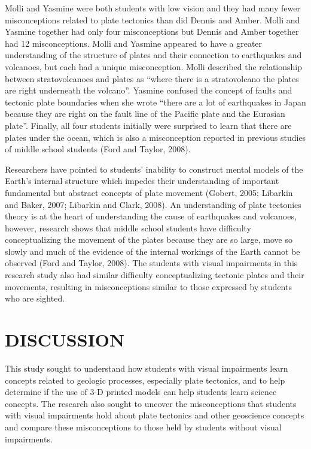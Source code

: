 \documentclass[11.5pt]{sig-alternate} %
\begin{document}
\begin{large}
Molli and Yasmine were both students with low vision and they had many fewer misconceptions related to plate tectonics than did Dennis and Amber.  Molli and Yasmine together had only four misconceptions but Dennis and Amber together had 12 misconceptions.  Molli and Yasmine appeared to have a greater understanding of the structure of plates and their connection to earthquakes and volcanoes, but each had a unique misconception.  Molli described the relationship between stratovolcanoes and plates as “where there is a stratovolcano the plates are right underneath the volcano”.  Yasmine confused the concept of faults and tectonic plate boundaries when she wrote “there are a lot of earthquakes in Japan because they are right on the fault line of the Pacific plate and the Eurasian plate”.  Finally, all four students initially were surprised to learn that there are plates under the ocean, which is also a misconception reported in previous studies of middle school students (Ford and Taylor, 2008). 

Researchers have pointed to students’ inability to construct mental models of the Earth’s internal structure which impedes their understanding of important fundamental but abstract concepts of plate movement (Gobert, 2005; Libarkin and Baker, 2007; Libarkin and Clark, 2008).  An understanding of plate tectonics theory is at the heart of understanding the cause of earthquakes and volcanoes, however, research shows that middle school students have difficulty conceptualizing the movement of the plates because they are so large, move so slowly and much of the evidence of the internal workings of the Earth cannot be observed (Ford and Taylor, 2008).   The students with visual impairments in this research study also had similar difficulty conceptualizing tectonic plates and their movements, resulting in misconceptions similar to those expressed by students who are sighted.

\section*{DISCUSSION}

This study sought to understand how students with visual impairments learn concepts related to geologic processes, especially plate tectonics, and to help determine if the use of 3-D printed models can help students learn science concepts.  The research also sought to uncover the misconceptions that students with visual impairments hold about plate tectonics and other geoscience concepts and compare these misconceptions to those held by students without visual impairments.  


\end{large}
\end{document}
